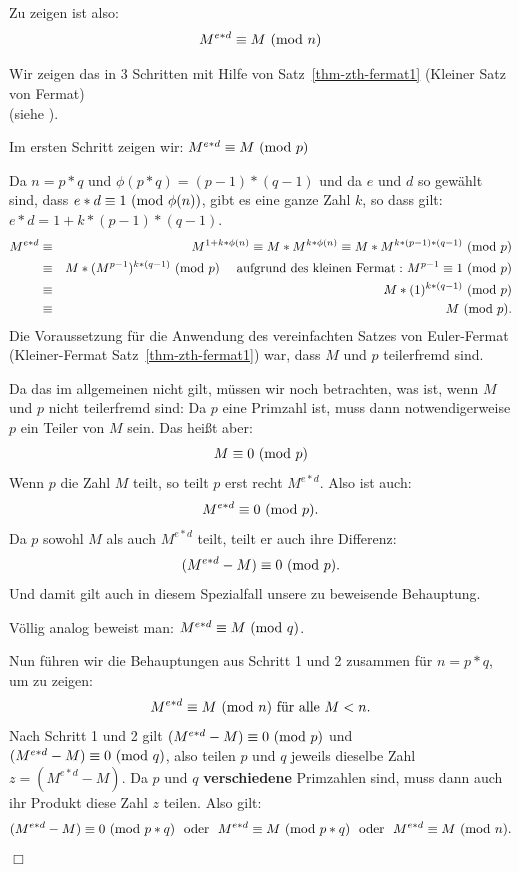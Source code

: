 \begin{refsegment}
\noindent Zu zeigen ist also:
   $$ M^{e * d}  \equiv  M  {\rm ~(mod~} n) $$

\noindent Wir zeigen das in 3 Schritten mit Hilfe von Satz~\ref{thm-zth-fermat1} (Kleiner Satz von Fermat)\\ (siehe \cite[S. 131ff]{Beutelspacher1996}).


\noindent Im ersten Schritt zeigen wir: $M^{e * d} \equiv M{\rm ~(mod~}p)$

\noindent Da $n=p*q$ und $\phi(p*q)=(p-1)*(q-1)$ und da $e$ und $d$ so gewählt sind, dass $e*d \equiv 1 {\rm ~(mod~}\phi(n))$,
gibt es eine ganze Zahl $k$, so dass gilt: $e*d = 1 + k*(p-1)*(q-1)$.
\begin{eqnarray*}
M^{e * d}  & \equiv & M^{1+k*\phi(n)} \equiv M * M^{k*\phi(n)} \equiv M * M^{k*(p-1)*(q-1)}{\rm ~(mod~}p) \nonumber\\
           & \equiv & M * (M^{p-1})^{k*(q-1)}{\rm ~(mod~}p) \quad {\rm ~aufgrund~des~kleinen~Fermat:~}
                  M^{p-1} \equiv 1 {\rm~(mod~}p) \nonumber\\
           & \equiv & M * (1)^{k*(q-1)} {\rm~(mod~}p) \nonumber\\
       & \equiv & M {\rm ~(mod~}p). \nonumber
\end{eqnarray*}
Die Voraussetzung für die Anwendung des vereinfachten Satzes von Euler-Fermat
(Kleiner-Fermat Satz~\ref{thm-zth-fermat1}) war, dass $M$ und $p$
teilerfremd sind.

Da das im allgemeinen nicht gilt, müssen wir noch betrachten, was ist, wenn
$M$ und $p$ nicht teilerfremd sind: Da $p$ eine Primzahl ist, muss dann
notwendigerweise $p$ ein Teiler von $M$ sein. Das heißt aber:
$$  M \equiv 0 {\rm ~(mod~}p) $$
Wenn $p$ die Zahl $M$ teilt, so teilt $p$ erst recht $M^{e * d}$. Also ist auch:
$$M^{e * d} \equiv 0 {\rm ~(mod~}p).$$
Da $p$ sowohl $M$ als auch $M^{e * d}$ teilt, teilt er auch ihre Differenz:
$$ (M^{e * d} - M ) \equiv 0 {\rm ~(mod~}p).$$
Und damit gilt auch in diesem Spezialfall unsere zu beweisende Behauptung.\\


\noindent Völlig analog beweist man:  $M^{e * d} \equiv M{\rm ~(mod~}q)$.\\


\noindent Nun führen wir die Behauptungen aus Schritt 1 und 2 zusammen für
$n=p*q$, um zu zeigen:
$$ M^{e * d} \equiv M{\rm ~(mod~}n) \mbox{~für~alle~} M < n. $$
Nach Schritt 1 und 2 gilt $(M^{e * d} - M) \equiv 0 {\rm ~(mod~} p)$ und $(M^{e * d} - M) \equiv 0 {\rm ~(mod~} q)$,
also teilen $p$ und $q$ jeweils dieselbe Zahl $z = (M^{e * d} - M)$.
Da $p$ und $q$ {\bf verschiedene} Primzahlen sind, muss dann auch ihr Produkt diese Zahl $z$ teilen. Also gilt:
$$
(M^{e * d} - M) \equiv 0 {\rm ~(mod~}p*q) {\rm ~~oder~~ } M^{e * d} \equiv M {\rm ~(mod~}p*q) {\rm ~~oder~~}
 M^{e * d} \equiv M {\rm ~(mod~}n).
$$
\hfill$\Box$



\end{refsegment}
